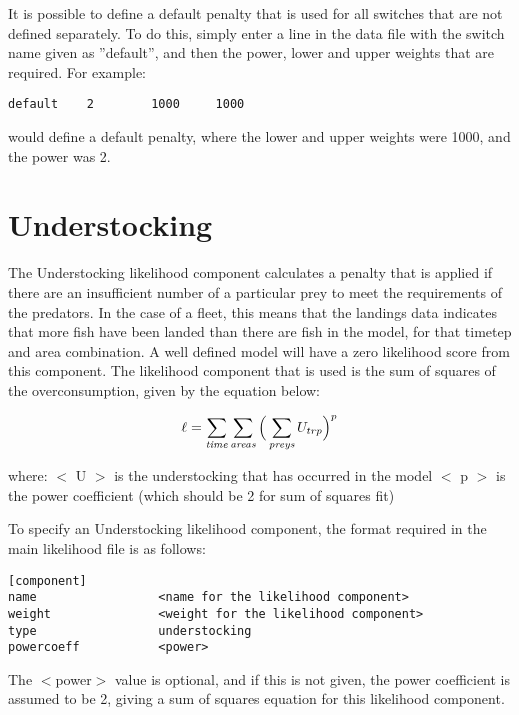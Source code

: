 \documentclass[10pt,twoside]{book}
\begin{document}
\bigskip
It is possible to define a default penalty that is used for all switches that are not defined separately.  To do this, simply enter a line in the data file with the switch name given as ''default'', and then the power, lower and upper weights that are required.  For example:

{\small\begin{verbatim}
default    2        1000     1000
\end{verbatim}}

would define a default penalty, where the lower and upper weights were 1000, and the power was 2.

\section{Understocking}\label{sec:understocking}
The Understocking likelihood component calculates a penalty that is applied if there are an insufficient number of a particular prey to meet the requirements of the predators.  In the case of a fleet, this means that the landings data indicates that more fish have been landed than there are fish in the model, for that timetep and area combination.  A well defined model will have a zero likelihood score from this component.  The likelihood component that is used is the sum of squares of the overconsumption, given by the equation below:

\begin{equation}\label{eq:understocking}
\ell = \sum_{\it time}\sum_{\it areas} \Big(\sum_{\it preys} U_{trp} \Big)^p
\end{equation}

where:\newline
$<$ U $>$ is the understocking that has occurred in the model\newline
$<$ p $>$ is the power coefficient (which should be 2 for sum of squares fit)

\bigskip
To specify an Understocking likelihood component, the format required in the main likelihood file is as follows:

{\small\begin{verbatim}
[component]
name                 <name for the likelihood component>
weight               <weight for the likelihood component>
type                 understocking
powercoeff           <power>
\end{verbatim}}

The $<$power$>$ value is optional, and if this is not given, the power coefficient is assumed to be 2, giving a sum of squares equation for this likelihood component.
\end{document}
